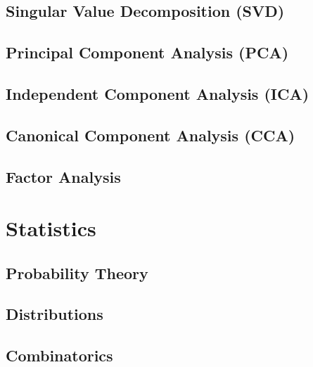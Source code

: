 \documentclass[11pt]{article}
\begin{document}
\subsection{Singular Value Decomposition (SVD)}
\subsection{Principal Component Analysis (PCA)}
\subsection{Independent Component Analysis (ICA)}
\subsection{Canonical Component Analysis (CCA)}
\subsection{Factor Analysis}

\section{Statistics}
\subsection{Probability Theory}
\subsection{Distributions}
\subsection{Combinatorics}
\end{document}
